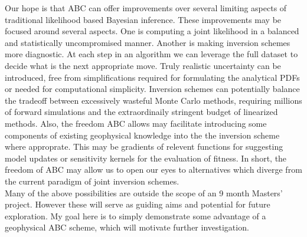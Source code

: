 Our hope is that ABC can offer improvements over several limiting aspects of traditional likelihood based Bayesian inference. These improvements may be focused around several aspects. One is computing a joint likelihood in a balanced and statistically uncompromised manner. Another is making inversion schemes more diagnostic. At each step in an algorithm we can leverage the full dataset to decide what is the next appropriate move. Truly realistic uncertainty can be introduced, free from simplifications required for formulating the analytical PDFs or needed for computational simplicity. Inversion schemes can potentially balance the tradeoff between excessively wasteful Monte Carlo methods, requiring millions of forward simulations and the extraordinaily stringent budget of linearized methods. Also, the freedom ABC allows may facilitate introducing some components of existing geophysical knowledge into the the inversion scheme where approprate. This may be gradients of relevent functions for suggesting model updates or sensitivity kernels for the evaluation of fitness. In short, the freedom of ABC may allow us to open our eyes to alternatives which diverge from the current paradigm of joint inversion schemes. \\

Many of the above possibilities are outside the scope of an 9 month Masters' project. However these will serve as guiding aims and potential for future exploration. My goal here is to simply demonstrate some advantage of a geophysical ABC scheme, which will motivate further investigation.